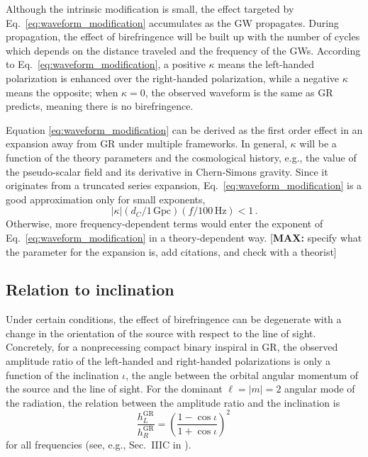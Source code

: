 \documentclass[aps,prd,twocolumn,superscriptaddress,preprintnumbers,floatfix,nofootinbib]{revtex4-2}
\newcommand*{\mi}[1]{\textsf{\color{magenta} [\textbf{MAX:} #1]}}
\begin{document}
Although the intrinsic modification is small, the effect targeted by Eq.~\eqref{eq:waveform_modification} accumulates as the \ac{GW} propagates.
During propagation, the effect of birefringence will be built up with the number of cycles which depends on the distance traveled and the frequency of the \acp{GW}.
According to Eq.~\eqref{eq:waveform_modification}, a positive $\kappa$ means the left-handed polarization is enhanced over the right-handed polarization, while a negative $\kappa$ means the opposite;
when $\kappa=0$, the observed waveform is the same as \ac{GR} predicts, meaning there is no birefringence.

Equation \eqref{eq:waveform_modification} can be derived as the first order effect in an expansion away from \ac{GR} under multiple frameworks.
In general, $\kappa$ will be a function of the theory parameters and the cosmological history, e.g., the value of the pseudo-scalar field and its derivative in Chern-Simons gravity.
Since it originates from a truncated series expansion, Eq.~\eqref{eq:waveform_modification} is a good approximation only for small exponents, 
\begin{equation}
\left|\kappa\right| \left(d_C/1\,\mathrm{Gpc}\right) \left(f/100\, \mathrm{Hz}\right) < 1\, .
\end{equation}
Otherwise, more frequency-dependent terms would enter the exponent of Eq.~\eqref{eq:waveform_modification} in a theory-dependent way.
\mi{specify what the parameter for the expansion is, add citations, and check with a theorist}

\subsection{Relation to inclination}
\label{sec:inclination}

Under certain conditions, the effect of birefringence can be degenerate with a change in the orientation of the source with respect to the line of sight.
Concretely, for a nonprecessing compact binary inspiral in \ac{GR}, the observed amplitude ratio of the left-handed and right-handed polarizations is only a function of the inclination $\iota$, the angle between the orbital angular momentum of the source and the line of sight.
For  the dominant $\ell = |m| = 2$ angular mode of the radiation, the relation between the amplitude ratio and the inclination is
\begin{equation}
    \frac{h_{L}^\mathrm{GR}}{h^\mathrm{GR}_{R}}=\left(\frac{1-\cos\iota}{1+\cos\iota}\right)^2\,
\end{equation}
for all frequencies (see, e.g., Sec.~IIIC in \cite{Isi:2022mbx}).
\end{document}
